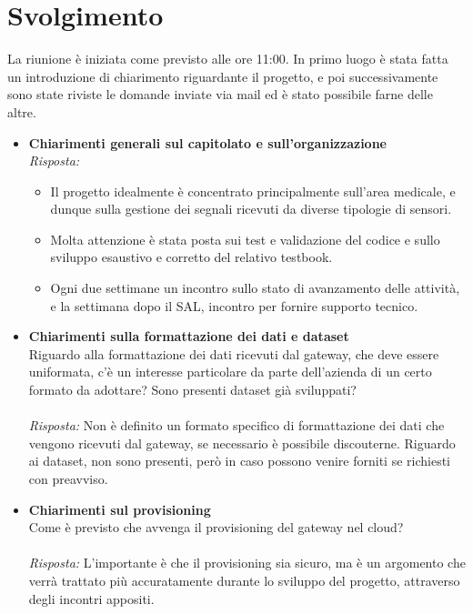 \documentclass[a4paper,12pt]{article}
\begin{document}
\section{Svolgimento}
    La riunione è iniziata come previsto alle ore 11:00. In primo luogo è stata fatta un introduzione di chiarimento riguardante il progetto, e poi successivamente sono state riviste le domande inviate via mail ed è stato possibile farne delle altre.
    \begin{itemize}
    \item \textbf{Chiarimenti generali sul capitolato e sull'organizzazione}\\
    \noindent
    \textit{Risposta:} \\
    \begin{itemize}
        \item Il progetto idealmente è concentrato principalmente sull'area medicale, e dunque sulla gestione dei segnali ricevuti da diverse tipologie di sensori.
        \item Molta attenzione è stata posta sui test e validazione del codice e sullo sviluppo esaustivo e corretto del relativo testbook.
        \item Ogni due settimane un incontro sullo stato di avanzamento delle attività, e la settimana dopo il SAL, incontro per fornire supporto tecnico.
    \end{itemize}
    
    \vspace{1cm}

    \item \textbf{Chiarimenti sulla formattazione dei dati e dataset}\\
    \noindent
    Riguardo alla formattazione dei dati ricevuti dal gateway, che deve essere uniformata, c'è un interesse particolare da parte dell'azienda di un certo formato da adottare? Sono presenti dataset già sviluppati?\\ \\
    \textit{Risposta:} 
    Non è definito un formato specifico di formattazione dei dati che vengono ricevuti dal gateway, se necessario è possibile discouterne. Riguardo ai dataset, non sono presenti, però in caso possono venire forniti se richiesti con preavviso.
    \vspace{1cm}
    

    \item \textbf{Chiarimenti sul provisioning}\\
    \noindent
    Come è previsto che avvenga il provisioning del gateway nel cloud?\\ \\
    \textit{Risposta:} 
    L'importante è che il provisioning sia sicuro, ma è un argomento che verrà trattato più accuratamente durante lo sviluppo del progetto, attraverso degli incontri appositi.
    \vspace{1cm}
    

\end{itemize}
\end{document}
